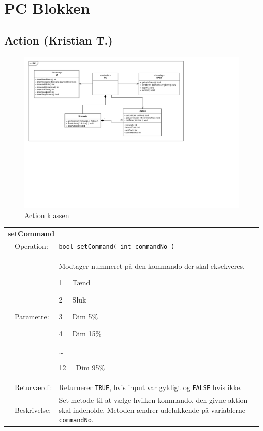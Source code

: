 
\section{PC Blokken}

\subsection{Action (Kristian T.)}

\begin{figure}[h]
\centering
\includegraphics[scale=1,clip=true, trim=389 282 302 204.7]{Systemarkitektur/diagrammer/PC_KlasseDiagram} %
\caption{Action klassen}
\end{figure}

\begin{table}[h] 
\begin{tabularx}{\textwidth}{p{0.6 cm} l X} %
\multicolumn{3}{l}{\textbf{setCommand}}\\
& Operation: & %
\texttt{bool setCommand( int commandNo )}
\\ & Parametre: & %
Modtager nummeret på den kommando der skal eksekveres.

1 = Tænd

2 = Sluk

3 = Dim 5\%

4 = Dim 15\%

\ldots 

12 = Dim 95\%

\\ & Returværdi: & %
Returnerer \texttt{TRUE}, hvis input var gyldigt og \texttt{FALSE} hvis ikke.
\\ & Beskrivelse: & %
Set-metode til at vælge hvilken kommando, den givne aktion skal indeholde. Metoden ændrer udelukkende på variablerne \texttt{commandNo}.
\\ \end{tabularx}
\end{table}

